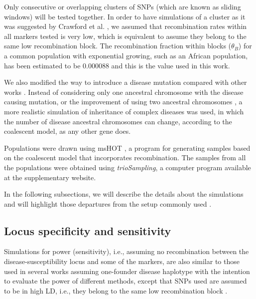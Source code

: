 \documentclass[runningheads]{llncs}
\begin{document}
Only consecutive or overlapping clusters of SNPs (which are known as sliding windows) will be tested together.
In order to have simulations of a cluster as it was suggested by Crawford et al. \cite{Crawford.zz.2004}, we assumed that recombination rates within all markers tested is very low, which is equivalent to assume they belong to the same low recombination block\cite{Daly.zz.2001}.
The recombination fraction within blocks ($\theta_B$) for a common population with exponential growing, such as an African population, has been estimated to be $0.000088$ \cite{Hinds.zz.2005} and this is the value used in this work. 

We also modified the way to introduce a disease mutation compared with other works \cite{Sham.97,Zhang.zz.2003,Yu.zz.2005}. Instead of considering only one ancestral chromosome with the disease causing mutation, or the improvement of using two ancestral chromosomes \cite{Zhang.zz.2003}, a more realistic simulation of inheritance of complex diseases was used, in which the number of disease ancestral chromosomes can change, according to the coalescent model, as any other gene does.

Populations were drawn using 
msHOT \cite{Hellenthal.Stephens.2007}, a program for generating samples based on the coalescent model that incorporates recombination. 
The samples from  all the  populations were obtained using {\em trioSampling}, a computer program available at the supplementary website. 


In the following subsections, we will describe the details about the simulations and will highlight those departures from the setup  commonly used \cite{Sham.97,Zhang.zz.2003,Yu.zz.2005}.




\subsection{Locus specificity and sensitivity}


Simulations for power (sensitivity), i.e., assuming no recombination between the disease-susceptibility locus and some of the markers, are also similar to those used in several works assuming one-founder disease haplotype \cite{Lam.zz.2000,Zhang.zz.2003,Yu.zz.2005} with the intention to evaluate the power of different methods, except that SNPs used are assumed to be in high LD, i.e., they belong to the same low recombination block \cite{Daly.zz.2001}. 
\end{document}
